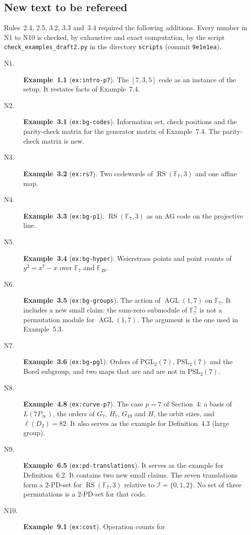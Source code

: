\documentclass[12pt,letterpaper]{article}
\newcommand{\F}{\mathbb{F}}
\newcommand{\AGL}{\operatorname{AGL}}
\newcommand{\RS}{\operatorname{RS}}
\begin{document}
\subsection{New text to be refereed}\label{sec:newtext}
Rules~2.4, 2.5, 3.2, 3.3 and~3.4 required the following additions. Every number
in N1 to N10 is checked, by exhaustive and exact computation, by the script
\texttt{check\_examples\_draft2.py} in the directory \texttt{scripts}
(commit \texttt{9e1e1ea}).
\begin{description}
\item[N1.] \textbf{Example~1.1} (\texttt{ex:intro-p7}). The $[7,3,5]$ code as an
instance of the setup. It restates facts of Example~7.4.
\item[N2.] \textbf{Example~3.1} (\texttt{ex:bg-codes}). Information set, check
positions and the parity-check matrix for the generator matrix of
Example~7.4. The parity-check matrix is new.
\item[N3.] \textbf{Example~3.2} (\texttt{ex:rs7}). Two codewords of
$\RS(\F_7,3)$ and one affine map.
\item[N4.] \textbf{Example~3.3} (\texttt{ex:bg-p1}). $\RS(\F_7,3)$ as an AG code
on the projective line.
\item[N5.] \textbf{Example~3.4} (\texttt{ex:bg-hyper}). Weierstrass points and
point counts of $y^2=x^7-x$ over $\F_7$ and $\F_{49}$.
\item[N6.] \textbf{Example~3.5} (\texttt{ex:bg-groups}). The action of
$\AGL(1,7)$ on $\F_7$. It includes a new small claim: the sum-zero submodule of
$\F_7^{\,7}$ is not a permutation module for $\AGL(1,7)$. The argument is the one
used in Example~5.3.
\item[N7.] \textbf{Example~3.6} (\texttt{ex:bg-pgl}). Orders of
$\mathrm{PGL}_2(7)$, $\mathrm{PSL}_2(7)$ and the Borel subgroup, and two maps
that are and are not in $\mathrm{PSL}_2(7)$.
\item[N8.] \textbf{Example~4.8} (\texttt{ex:curve-p7}). The case $p=7$ of
Section~4: a basis of $L(7P_\infty)$, the orders of $G_7$, $H_7$, $G_{49}$ and
$H$, the orbit sizes, and $\ell(D_2)=82$. It also serves as the example for
Definition~4.3 (large group).
\item[N9.] \textbf{Example~6.5} (\texttt{ex:pd-translations}). It serves as the
example for Definition~6.2. It contains two new small claims. The seven
translations form a $2$-PD-set for $\RS(\F_7,3)$ relative to
$\mathcal I=\{0,1,2\}$. No set of three permutations is a $2$-PD-set for that
code.
\item[N10.] \textbf{Example~9.1} (\texttt{ex:cost}). Operation counts for

\end{description}
\end{document}
